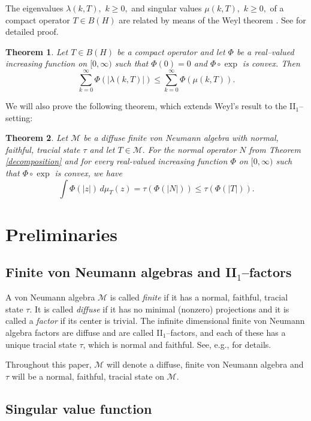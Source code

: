 \documentclass{amsart}
\theoremstyle{plain}
\newtheorem{thm}{Theorem}
\theoremstyle{remark}
\begin{document}
The eigenvalues $\lambda(k,T),$ $k\geq0,$ and singular values $\mu(k,T),$ $k\geq0,$ of a compact operator $T\in B(H)$ are related by means of the Weyl theorem \cite{Weyl}. See \cite{GK1} for detailed proof.

\begin{thm}\label{weyl orig} Let $T\in B(H)$ be a compact operator and let $\Phi$ be a real--valued increasing function on $[0,\infty)$
such that $\Phi(0)=0$ and $\Phi\circ\exp$ is convex. Then
$$\sum_{k=0}^{\infty}\Phi(|\lambda(k,T)|)\leq\sum_{k=0}^{\infty}\Phi(\mu(k,T)).$$
\end{thm}

We will also prove the following theorem, which extends Weyl's result to the II$_1$--setting:
\begin{thm}\label{thm:WeylII1} Let $\mathcal{M}$ be 
a diffuse finite von Neumann algebra with
normal, faithful, tracial state $\tau$
and let $T\in\mathcal{M}.$ For the normal operator $N$ from Theorem \ref{decomposition} and for every 
real-valued increasing function $\Phi$ on $[0,\infty)$ such that $\Phi\circ\exp$ is convex, we have
$$ \int\Phi(|z|)\,d\mu_T(z)=\tau(\Phi(|N|))\leq\tau(\Phi(|T|)).$$ 
\end{thm}

\section{Preliminaries}

\subsection{Finite von Neumann algebras and II$_1$--factors}
\label{subsec:II1}

A von Neumann algebra $\mathcal{M}$ is called
{\em finite} if it has a normal, faithful, tracial state $\tau$.
It is called {\em diffuse} if it has no minimal (nonzero) projections and it is called 
a {\em factor} if its center is trivial.
The infinite dimensional finite von Neumann algebra factors are diffuse and are called II$_1$--factors, and each of these
has a unique tracial state $\tau$, which is normal and faithful.
See, e.g., \cite{KR1} for details.

Throughout this paper, $\mathcal{M}$ will denote a diffuse, finite von Neumann algebra and $\tau$ will be a normal, faithful, tracial state
on $\mathcal{M}$.

\subsection{Singular value function}
\end{document}
